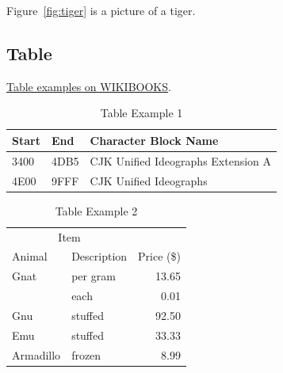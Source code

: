 Figure~\ref{fig:tiger} is a picture of a tiger.


\subsection{Table}
\label{ss:Table}

\href{http://en.wikibooks.org/wiki/LaTeX/Tables}{Table examples on WIKIBOOKS}.

\begin{table}[htpb]\begin{center}
\caption{Table Example 1}
\begin{tabularx}{8cm}{llX}
\hline
Start & End  & Character Block Name \\
\hline
3400  & 4DB5 & CJK Unified Ideographs Extension A \\
4E00  & 9FFF & CJK Unified Ideographs \\
\hline
\end{tabularx}
 \end{center}\end{table}

\begin{table}[htpb]\begin{center}
\caption{Table Example 2}
\begin{tabular}{llr}
\hline
\multicolumn{2}{c}{Item} \\
\cline{1-2}
Animal & Description & Price (\$) \\
\hline
Gnat  & per gram & 13.65 \\
      & each     &  0.01 \\
Gnu   & stuffed  & 92.50 \\
Emu   & stuffed  & 33.33 \\
Armadillo & frozen & 8.99 \\
\hline
\end{tabular}
 \end{center}\end{table}
 
